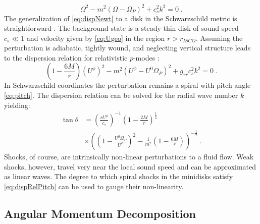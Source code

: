 \documentclass{emulateapj}
\begin{document}
\begin{equation}
	\Omega^2 - m^2(\Omega-\Omega_P)^2 + c_s^2 k^2 = 0 \ . \label{eq:dispNewt}
\end{equation}
The generalization of \eqref{eq:dispNewt} to a disk in the Schwarzschild metric is straightforward \citep{Perez97}.  The background state is a steady thin disk of sound speed $c_s \ll 1$ and velocity given by \eqref{eq:Ugeo} in the region $r > r_{ISCO}$.  Assuming the perturbation is adiabatic, tightly wound, and neglecting vertical structure leads to the dispersion relation for relativistic $p$-modes \citep{Abramowicz13}:
\begin{equation}
	\left(1-\frac{6M}{r} \right)\left(U^\phi\right)^2 - m^2(U^\phi-U^0\Omega_P)^2 + g_{rr} c_s^2 k^2 = 0 \ . \label{eq:disprel}
\end{equation}
In Schwarzschild coordinates the perturbation remains a spiral with pitch angle \eqref{eq:pitch}.  The dispersion relation can be solved for the radial wave number $k$ yielding:
\begin{align}
	\tan \theta &= \left( \frac{r U^\phi}{c_s} \right)^{-1} \left(1-\frac{2M}{r}\right)^{\frac{1}{2}} \label{eq:dispRelPitch} \\ \nonumber
		&\times \left(\left(1- \frac{U^0 \Omega_P}{U^\phi}\right)^2 - \frac{1}{m^2}\left(1-\frac{6M}{r}\right)\right)^{-\frac{1}{2}}\ . 
\end{align}
Shocks, of course, are intrinsically non-linear perturbations to a fluid flow.  Weak shocks, however, travel very near the local sound speed and can be approximated as linear waves.  The degree to which spiral shocks in the minidisks satisfy \eqref{eq:dispRelPitch} can be used to gauge their non-linearity.  

\subsection{Angular Momentum Decomposition}
\label{subsec:angMomDecom}
\end{document}
